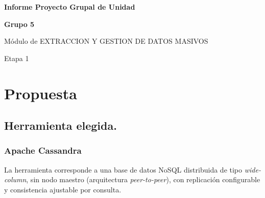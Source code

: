 \documentclass[12pt]{article}
\begin{document}
\begin{center}
    \vspace*{2cm}
    
    {\huge\textbf{Informe Proyecto Grupal de Unidad }}

    {\vspace{1cm}}

    {\Large\textbf{Grupo 5}}
    
    {\vspace{1cm}}
    
    {\Large Módulo de EXTRACCION Y GESTION DE DATOS MASIVOS}

    {\vspace{1cm}}

    {\Large Etapa 1}
    
\end{center}

\newpage
%
%
%
%
%
%
%
%
%
%

\newpage
\section{Propuesta}
\subsection{Herramienta elegida.}
\subsubsection*{Apache Cassandra} La herramienta corresponde a una base de datos NoSQL distribuida de tipo
\textit{wide-column}, sin nodo maestro (arquitectura \textit{peer-to-peer}), con replicación configurable
y consistencia ajustable por consulta. 
\end{document}
